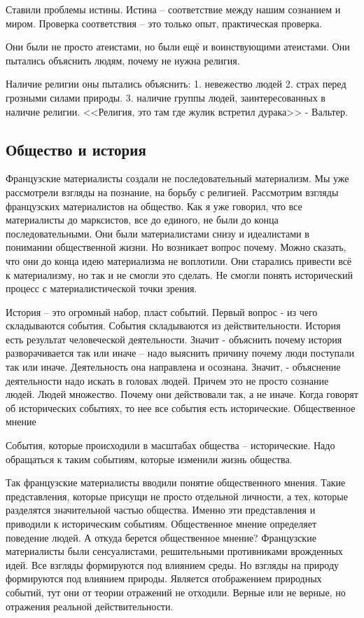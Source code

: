 Ставили проблемы истины. Истина – соответствие между нашим сознанием и миром. Проверка соответствия – это только опыт, практическая проверка.

Они были не просто атеистами, но были ещё и воинствующими атеистами. Они пытались объяснить людям, почему не нужна религия.

Наличие религии оны пытались объяснить: 1. невежество людей 2. страх перед грозными силами природы. 3. наличие группы людей, заинтересованных в наличие религии. <<Религия, это там где жулик встретил дурака>> - Вальтер.
\subsection{Общество и история}

Французские материалисты создали не последовательный материализм. Мы уже рассмотрели взгляды на познание, на борьбу с религией. Рассмотрим взгляды французских материалистов на общество. Как я уже говорил, что все материалисты до марксистов, все до единого, не были до конца последовательными. Они были материалистами снизу и идеалистами в понимании общественной жизни. Но возникает вопрос почему. Можно сказать, что они до конца идею материализма не воплотили. Они старались привести всё к материализму, но так и не смогли это сделать. Не смогли понять исторический процесс с материалистической точки зрения.

История – это огромный набор, пласт событий. Первый вопрос - из чего складываются события. События складываются из действительности. История есть результат человеческой деятельности. Значит - объяснить почему история разворачивается так или иначе – надо выяснить причину почему люди поступали так или иначе. Деятельность она направлена и осознана. Значит, - объяснение деятельности надо искать в головах людей. Причем это не просто сознание людей. Людей множество. Почему они действовали так, а не иначе. Когда говорят об исторических событиях, то нее все события есть исторические.
Общественное мнение

События, которые происходили в масштабах общества – исторические. Надо обращаться к таким событиям, которые изменили жизнь общества.

    Так французские материалисты вводили понятие общественного мнения. Такие представления, которые присущи не просто отдельной личности, а тех, которые разделятся значительной частью общества. Именно эти представления и приводили к историческим событиям. Общественное мнение определяет поведение людей. А откуда берется общественное мнение? Французские материалисты были сенсуалистами, решительными противниками врожденных идей. Все взгляды формируются под влиянием среды. Но взгляды на природу формируются под влиянием природы. Является отображением природных событий, тут они от теории отражений не отходили. Верные или не верные, но отражения реальной действительности.

